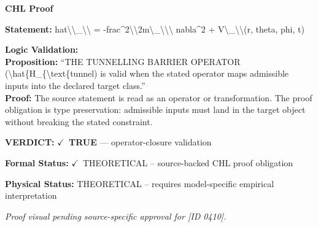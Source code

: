 \vspace{0.45em}
\noindent\textbf{CHL Proof}\par
\textbf{Statement:} hat\textbackslash{}\textbackslash{}\_\textbackslash{}\textbackslash{} = -frac\textasciicircum{}2\textbackslash{}\textbackslash{}2m\textbackslash{}\_\textbackslash{}\textbackslash{}\textbackslash{} nabla\textasciicircum{}2 + V\textbackslash{}\_\textbackslash{}\textbackslash{}(r, theta, phi, t)

\textbf{Logic Validation:}\\
\textbf{Proposition:} ``THE TUNNELLING BARRIER OPERATOR (\textbackslash{}hat\{H\_\{\textbackslash{}text\{tunnel) is valid when the stated
operator maps admissible inputs into the declared target class.''\\
\textbf{Proof:} The source statement is read as an operator or transformation. The proof obligation is
type preservation: admissible inputs must land in the target object without breaking the
stated constraint.

\textbf{VERDICT:} \ensuremath{\checkmark}\ \textbf{TRUE} --- operator-closure validation

\textbf{Formal Status:} \ensuremath{\checkmark}\ THEORETICAL -- source-backed CHL proof obligation

\textbf{Physical Status:} THEORETICAL -- requires model-specific empirical interpretation
\par\vspace{0.45em}
\par
\vfill
\begingroup\footnotesize\itshape
Proof visual pending source-specific approval for [ID 0410].
\par\endgroup
\vfill
\endgroup
\endgroup
